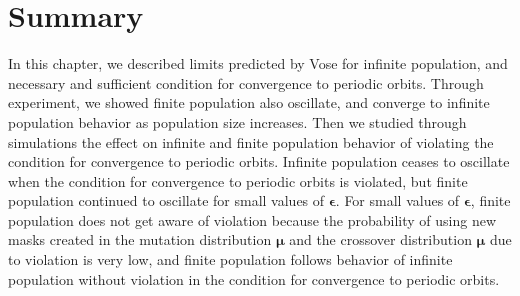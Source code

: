 \section{Summary}
In this chapter, we described limits predicted by Vose for infinite population, and necessary and sufficient condition 
for convergence to periodic orbits. Through experiment, we showed finite population also oscillate, 
and converge to infinite population behavior as population size increases. 
Then we studied through simulations the effect on infinite and finite population behavior of violating the condition 
for convergence to periodic orbits. Infinite population ceases to oscillate when the condition for convergence to 
periodic orbits is violated, but finite population continued to oscillate for small values of $\bm{\epsilon}$. 
For small values of $\bm{\epsilon}$, finite population does not get aware of violation because the probability of using 
new masks created in the mutation distribution $\bm{\mu}$ and the crossover distribution $\bm{\mu}$ due to violation is very low, and 
finite population follows behavior of infinite population without violation in the condition for convergence to 
periodic orbits.





 
